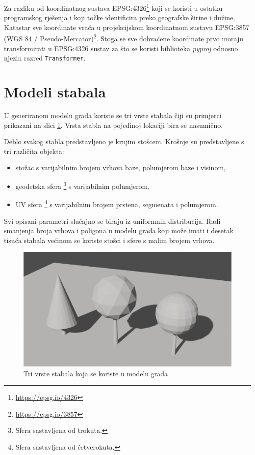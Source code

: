 \documentclass[times, utf8, zavrsni, numeric]{fer}
\begin{document}
		Za razliku od koordinatnog sustava EPSG:4326\footnote{\url{https://epsg.io/4326}} koji se koristi u ostatku programskog rješenja i koji točke identificira preko geografske širine i dužine, Katastar sve koordinate vraća u projekcijskom koordinatnom sustavu EPSG:3857 (WGS 84 / Pseudo-Mercator)\footnote{\url{https://epsg.io/3857}}.
		Stoga se sve dohvaćene koordinate prvo moraju transformirati u EPSG:4326 sustav za što se koristi biblioteka \textit{pyproj} odnosno njezin razred \texttt{Transformer}.
	
	
	
	\section{Modeli stabala}
	
		U generiranom modelu grada koriste se tri vrste stabala čiji su primjerci prikazani na slici \ref{fig:tree_types}.
		Vrsta stabla na pojedinoj lokaciji bira se nasumično.
		
		Deblo svakog stabla predstavljeno je krnjim stošcem.
		Krošnje su predstavljene s tri različita objekta:
		\begin{itemize}
			\item stožac s varijabilnim brojem vrhova baze, polumjerom baze i visinom,
			\item geodetska sfera \footnote{Sfera sastavljena od trokuta.} s varijabilnim polumjerom,
			\item UV sfera \footnote{Sfera sastavljena od četverokuta.} s varijabilnim brojem prstena, segmenata i \mbox{polumjerom}.
		\end{itemize}
		
		Svi opisani parametri slučajno se biraju iz uniformnih distribucija.
		Radi smanjenja broja vrhova i poligona u modelu grada koji može imati i desetak tisuća stabala većinom se koriste stošci i sfere s malim brojem vrhova.
		
		\begin{figure}
			\includegraphics[width=.9\linewidth]{figures/tree_types.jpg}
			\centering
			\caption{Tri vrste stabala koja se koriste u modelu grada}
			\label{fig:tree_types}
		\end{figure}
\end{document}
